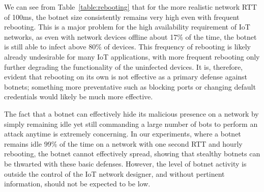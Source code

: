 

We can see from Table~\ref{table:rebooting} that for the more realistic network RTT of 100ms, the botnet size consistently remains very high even with frequent rebooting. This is a major problem for the high availability requirement of IoT networks, as even with network devices offline about 17\% of the time, the botnet is still able to infect above 80\% of devices. This frequency of rebooting is likely already undesirable for many IoT applications, with more frequent rebooting only further degrading the functionality of the uninfected devices. It is, therefore, evident that rebooting on its own is not effective as a primary defense against botnets; something more preventative such as blocking ports or changing default credentials would likely be much more effective.

\par
The fact that a botnet can effectively hide its malicious presence on a network by simply remaining idle yet still commanding a large number of bots to perform an attack anytime is extremely concerning. In our experiments, where a botnet remains idle 99\% of the time on a network with one second RTT and hourly rebooting, the botnet cannot effectively spread, showing that stealthy botnets can be thwarted with these basic defenses. However, the level of botnet activity is outside the control of the IoT network designer, and without pertinent information, should not be expected to be low.

